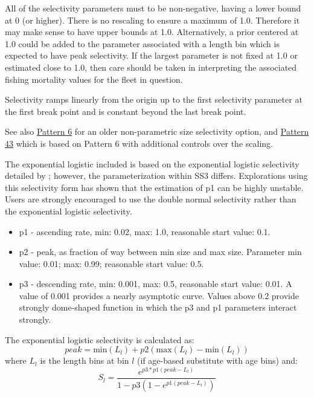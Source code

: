 All of the selectivity parameters must to be non-negative, having a lower bound at 0 (or higher). There is no rescaling to ensure a maximum of 1.0. Therefore it may make sense to have upper bounds at 1.0. Alternatively, a prior centered at 1.0 could be added to the parameter associated with a length bin which is expected to have peak selectivity. If the largest parameter is not fixed at 1.0 or estimated close to 1.0, then care should be taken in interpreting the associated fishing mortality values for the fleet in question.

Selectivity ramps linearly from the origin up to the first selectivity parameter at the first break point and is constant beyond the last break point.

See also \hyperlink{NonParamSelectivity6}{Pattern 6} for an older non-parametric size selectivity option, and \hyperlink{NonParamScaling}{Pattern 43} which is based on Pattern 6 with additional controls over the scaling.

\hypertarget{ExponentialLogistic}{}
The exponential logistic included is based on the exponential logistic selectivity detailed by \citet{thompson-confounding-1994}; however, the parameterization within SS3 differs. Explorations using this selectivity form has shown that the estimation of p1 can be highly unstable. Users are strongly encouraged to use the double normal selectivity rather than the exponential logistic selectivity.
	\begin{itemize}
		\item p1 - ascending rate, min: 0.02, max: 1.0, reasonable start value: 0.1.
		\item p2 - peak, as fraction of way between min size and max size. Parameter min value: 0.01; max: 0.99; reasonable start value: 0.5.
		\item p3 - descending rate, min: 0.001, max: 0.5, reasonable start value: 0.01. A value of 0.001 provides a nearly asymptotic curve. Values above 0.2 provide strongly dome-shaped function in which the p3 and p1 parameters interact strongly.
	\end{itemize}

The exponential logistic selectivity is calculated as:
	\begin{equation}
	peak = \text{min}(L_l) + p2(\text{max}(L_l) - \text{min}(L_l) )
	\end{equation}
where $L_l$ is the length bins at bin $l$ (if age-based substitute with age bins) and:
	\begin{equation}
	S_l = \frac{e^{p3*p1(peak-L_l)}}{1-p3(1-e^{p1(peak- L_l)})}
	\end{equation}

